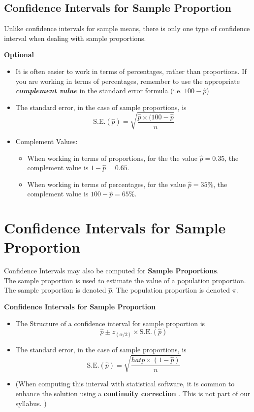 \documentclass[]{report}
\begin{document}

\subsection{Confidence Intervals for Sample Proportion}
Unlike confidence intervals for sample means, there is only one type of confidence interval when dealing with sample proportions.

\textbf{Optional}
\begin{itemize}

\item It is often easier to work in terms of percentages, rather than proportions.
If you are working in terms of percentages, remember to use the appropriate \textbf{\textit{complement value}} in the standard error formula (i.e. $100 - \hat{p}$)

\item The standard error, in the case of sample proportions, is
\[ \mbox{S.E.}(\hat{p}) = \sqrt{\frac{\hat{p}\times (100-\hat{p}}{n}}\]

\item Complement Values:
\begin{itemize} \item When working in terms of proportions, for the the value $\hat{p} =0.35$, the complement value is $1-\hat{p} =0.65$.
\item When working in terms of percentages, for the value $\hat{p} = 35\%$, the complement value is $100-\hat{p} = 65\%$.
\end{itemize}
\end{itemize}




\section{Confidence Intervals for Sample Proportion}
Confidence Intervals may also be computed for \textbf{Sample Proportions}. \\The sample proportion is used to estimate the value of a population proportion. The sample proportion is denoted $\hat{p}$. The population proportion is denoted $\pi$.

\begin{framed}
	\textbf{Confidence Intervals for Sample Proportion}
	
	\begin{itemize}
		\item The Structure of a confidence interval for sample proportion is 
		\[ \hat{p} \pm z_{(\alpha/2)} \times \mbox{S.E.}(\hat{p})\]
		
		\item The standard error, in the case of sample proportions, is
		\[ \mbox{S.E.}(\hat{p}) = \sqrt{\frac{hat{p}\times (1-\hat{p})}{n}}\]
		\item (When computing this interval with statistical software, it is common to enhance the solution using a \textbf{continuity correction} . This is not part of our syllabus. )
	\end{itemize}
\end{framed}
\end{document}
